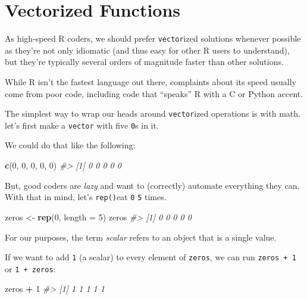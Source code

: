 \documentclass[
]{report}
\newenvironment{Shaded}{\begin{snugshade}}{\end{snugshade}}
\newcommand{\CommentTok}[1]{\textcolor[rgb]{0.56,0.35,0.01}{\textit{#1}}}
\newcommand{\DataTypeTok}[1]{\textcolor[rgb]{0.13,0.29,0.53}{#1}}
\newcommand{\DecValTok}[1]{\textcolor[rgb]{0.00,0.00,0.81}{#1}}
\newcommand{\KeywordTok}[1]{\textcolor[rgb]{0.13,0.29,0.53}{\textbf{#1}}}
\newcommand{\NormalTok}[1]{#1}
\newcommand{\OperatorTok}[1]{\textcolor[rgb]{0.81,0.36,0.00}{\textbf{#1}}}
\newcommand{\StringTok}[1]{\textcolor[rgb]{0.31,0.60,0.02}{#1}}
\begin{document}
\hypertarget{vectorized-functions}{%
\section{Vectorized Functions}\label{vectorized-functions}}

As high-speed R coders, we should prefer \texttt{vector}ized solutions whenever possible as they're not only idiomatic (and thus easy for other R users to understand), but they're typically several orders of magnitude faster than other solutions.

While R isn't the fastest language out there, complaints about its speed usually come from poor code, including code that ``speaks'' R with a C or Python accent.

The simplest way to wrap our heads around \texttt{vector}ized operations is with math. let's first make a \texttt{vector} with five \texttt{0}s in it.

We could do that like the following:

\begin{Shaded}
\begin{Highlighting}[]
\KeywordTok{c}\NormalTok{(}\DecValTok{0}\NormalTok{, }\DecValTok{0}\NormalTok{, }\DecValTok{0}\NormalTok{, }\DecValTok{0}\NormalTok{, }\DecValTok{0}\NormalTok{)}
\CommentTok{\#\textgreater{} [1] 0 0 0 0 0}
\end{Highlighting}
\end{Shaded}

But, good coders are \emph{lazy} and want to (correctly) automate everything they can. With that in mind, let's \texttt{rep()}eat \texttt{0} \texttt{5} times.

\begin{Shaded}
\begin{Highlighting}[]
\NormalTok{zeros \textless{}{-}}\StringTok{ }\KeywordTok{rep}\NormalTok{(}\DecValTok{0}\NormalTok{, }\DataTypeTok{length =} \DecValTok{5}\NormalTok{)}
\NormalTok{zeros}
\CommentTok{\#\textgreater{} [1] 0 0 0 0 0}
\end{Highlighting}
\end{Shaded}

For our purposes, the term \emph{scalar} refers to an object that is a single value.

If we want to add \texttt{1} (a scalar) to every element of \texttt{zeros}, we can run \texttt{zeros\ +\ 1} or \texttt{1\ +\ zeros}:

\begin{Shaded}
\begin{Highlighting}[]
\NormalTok{zeros }\OperatorTok{+}\StringTok{ }\DecValTok{1}
\CommentTok{\#\textgreater{} [1] 1 1 1 1 1}
\end{Highlighting}
\end{Shaded}
\end{document}
